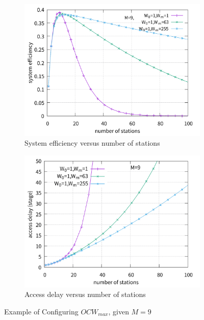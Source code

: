 \documentclass[journal]{IEEEtran}
\begin{document}
\begin{figure}[!t]
\centering
\begin{subfigure}{0.5\textwidth}  
  \centering  
  \includegraphics[scale=0.38]{./figure/Section_perf_eval/W0/n_eff_perf_W01.pdf}  
    \caption{System efficiency versus number of stations}   
    \label{fig_n_eff_Wm}
\end{subfigure}   

\begin{subfigure}{0.5\textwidth}
	\centering
\includegraphics[scale=.38]{./figure/Section_perf_eval/W0/n_delay_perf_W01.pdf}
\caption{Access delay versus number of stations}
\label{fig_n_delay_Wm}
\end{subfigure}
\caption{Example of Configuring $OCW_{max}$, given $M=9$}
\label{fig_Wm}
\end{figure}
\end{document}

